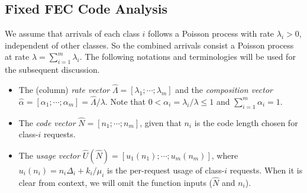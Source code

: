 \documentclass[journal]{IEEEtran}
\newcommand{\rateVec}{\hat{\Lambda}}
\newcommand{\codeVec}{\hat{N}}
\newcommand{\usageVec}{\hat{U}}
\newcommand{\compVec}{\hat{\alpha}}
\begin{document}
\subsection{Fixed FEC Code Analysis}
\label{ssec:multi:fixed}
We assume that arrivals of each class $i$ follows a Poisson process with rate $\lambda_i>0$, independent of other classes. So the combined arrivals consist a Poisson process at rate $\lambda = \sum_{i=1}^m \lambda_i$. The following notations and terminologies will be used for the subsequent discussion.

\begin{itemize}
\item The (column) {\em rate vector} $\rateVec = [\lambda_1;\cdots;\lambda_m]$ and the {\em composition vector} $\compVec = [\alpha_1;\cdots;\alpha_m] = \rateVec /\lambda$. Note that $0< \alpha_i = \lambda_i/\lambda \le 1$ and $\sum_{i=1}^m \alpha_i = 1$. 

\item 
The {\em code vector} $\codeVec=[n_1;\cdots;n_m]$, given that $n_i$ is the code length chosen for class-$i$ requests.


\item 
The {\em usage vector} $\usageVec(\codeVec)=[u_1(n_1);\cdots;u_m(n_m)]$, where $u_i(n_i) = n_i \Delta_i + k_i / \mu_i$ is the per-request usage of class-$i$ requests. When it is clear from context, we will omit the function inputs ($\codeVec$ and $n_i$). 
\end{itemize}
\end{document}
